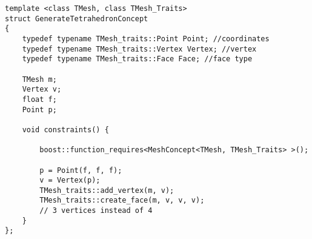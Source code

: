 \begin{appendices}
\begin{lstlisting}
template <class TMesh, class TMesh_Traits>
struct GenerateTetrahedronConcept
{
	typedef typename TMesh_traits::Point Point; //coordinates
	typedef typename TMesh_traits::Vertex Vertex; //vertex
	typedef typename TMesh_traits::Face Face; //face type

	TMesh m;
	Vertex v;
	float f;
	Point p;

	void constraints() {

		boost::function_requires<MeshConcept<TMesh, TMesh_Traits> >();

		p = Point(f, f, f);
		v = Vertex(p);
		TMesh_traits::add_vertex(m, v);
		TMesh_traits::create_face(m, v, v, v);
		// 3 vertices instead of 4
	}
};
\end{lstlisting}

\end{appendices}